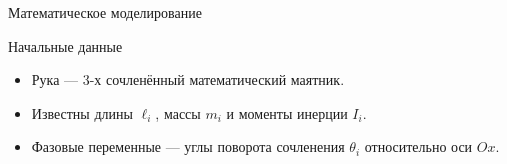    \begin{frame}{Математическое моделирование}
        \begin{block}{Начальные данные}
            \begin{itemize}
                \item Рука --- 3-х сочленённый математический маятник.
                \item Известны длины $\ell_i$, массы $m_i$ и моменты инерции $I_i$.
                \item Фазовые переменные --- углы поворота сочленения $\theta_i$ относительно оси $Ox$. 
            \end{itemize}
        \end{block}
    \end{frame}

